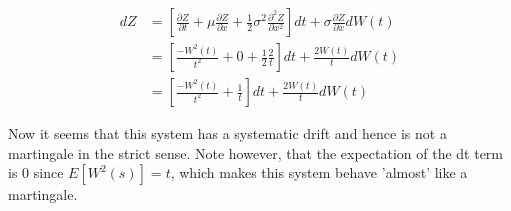 \documentclass[11pt,a4paper,onecolumn]{article}
\begin{document}
\begin{align}
  dZ &= \left[ \frac{\partial Z}{\partial t} + \mu \frac{\partial Z}{\partial x} + \frac{1}{2}\sigma^2\frac{\partial^2Z}{\partial x^2}\right]dt + \sigma\frac{\partial Z}{\partial x}dW(t) \\
  &= \left[\frac{-W^2(t)}{t^2} + 0 + \frac{1}{2}\frac{2}{t} \right]dt + \frac{2W(t)}{t}dW(t) \\
  &= \left[ \frac{-W^2(t)}{t^2} + \frac{1}{t}\right]dt + \frac{2W(t)}{t}dW(t)
\end{align}

Now it seems that this system has a systematic drift and hence is not a martingale in the strict sense. Note however, that the expectation of the dt term is 0 since $E[W^2(s)] = t$, which makes this system behave 'almost' like a martingale.
\end{document}
